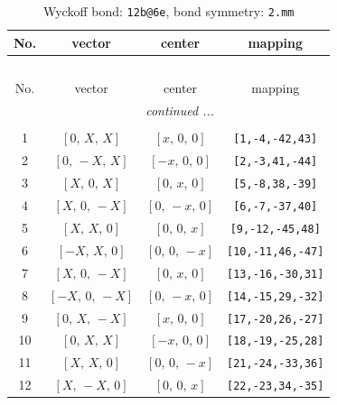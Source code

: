 \documentclass[fleqn,8pt]{jsarticle}
\begin{document}
\renewcommand{\arraystretch}{1.2}
\begin{longtable}{cccc}
\caption{Wyckoff bond: {\tt 12b@6e}, bond symmetry: {\tt 2.mm}}
 \\
 \hline \hline
No. & vector & center & mapping \\ \hline \endfirsthead

\multicolumn{3}{l}{\tablename\ \thetable{}} \\
 \hline \hline
No. & vector & center & mapping \\ \hline \endhead

 \hline \hline
\multicolumn{3}{r}{\footnotesize\it continued ...} \\ \endfoot

 \hline \hline
\multicolumn{3}{r}{} \\ \endlastfoot

1 & $\left[ 0,\, X,\, X \right]$ & $\left[ x,\, 0,\, 0 \right]$ & {\tt [1,-4,-42,43]} \\ \hline
2 & $\left[ 0,\, - X,\, X \right]$ & $\left[ - x,\, 0,\, 0 \right]$ & {\tt [2,-3,41,-44]} \\ \hline
3 & $\left[ X,\, 0,\, X \right]$ & $\left[ 0,\, x,\, 0 \right]$ & {\tt [5,-8,38,-39]} \\ \hline
4 & $\left[ X,\, 0,\, - X \right]$ & $\left[ 0,\, - x,\, 0 \right]$ & {\tt [6,-7,-37,40]} \\ \hline
5 & $\left[ X,\, X,\, 0 \right]$ & $\left[ 0,\, 0,\, x \right]$ & {\tt [9,-12,-45,48]} \\ \hline
6 & $\left[ - X,\, X,\, 0 \right]$ & $\left[ 0,\, 0,\, - x \right]$ & {\tt [10,-11,46,-47]} \\ \hline
7 & $\left[ X,\, 0,\, - X \right]$ & $\left[ 0,\, x,\, 0 \right]$ & {\tt [13,-16,-30,31]} \\ \hline
8 & $\left[ - X,\, 0,\, - X \right]$ & $\left[ 0,\, - x,\, 0 \right]$ & {\tt [14,-15,29,-32]} \\ \hline
9 & $\left[ 0,\, X,\, - X \right]$ & $\left[ x,\, 0,\, 0 \right]$ & {\tt [17,-20,26,-27]} \\ \hline
10 & $\left[ 0,\, X,\, X \right]$ & $\left[ - x,\, 0,\, 0 \right]$ & {\tt [18,-19,-25,28]} \\ \hline
11 & $\left[ X,\, X,\, 0 \right]$ & $\left[ 0,\, 0,\, - x \right]$ & {\tt [21,-24,-33,36]} \\ \hline
12 & $\left[ X,\, - X,\, 0 \right]$ & $\left[ 0,\, 0,\, x \right]$ & {\tt [22,-23,34,-35]} \\
\end{longtable}
\end{document}
